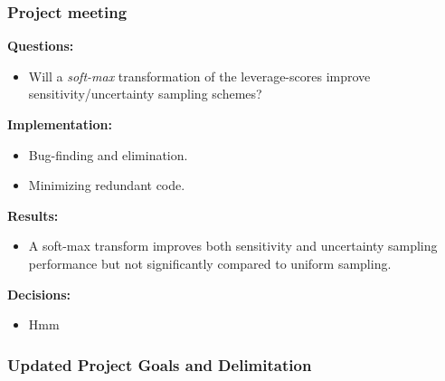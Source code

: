 \documentclass[11pt, a4paper]{article} %
\begin{document}
\subsubsection*{Project meeting}
\textbf{Questions:}\\
\begin{itemize}
\item Will a \emph{soft-max} transformation of the leverage-scores improve sensitivity/uncertainty sampling schemes?
\end{itemize}

\textbf{Implementation:}\\
\begin{itemize}
\item Bug-finding and elimination.
\item Minimizing redundant code.
\end{itemize}

\textbf{Results:}\\
\begin{itemize}
\item A soft-max transform improves both sensitivity and uncertainty sampling performance but not significantly compared to uniform sampling. 
\end{itemize}

\textbf{Decisions:}\\
\begin{itemize}
\item Hmm
\end{itemize}

\subsubsection*{Updated Project Goals and Delimitation}
\end{document}
